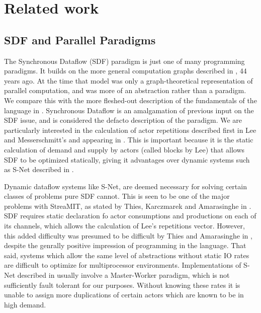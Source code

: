 \section{Related work}

\subsection*{SDF and Parallel Paradigms}

The Synchronous Dataflow (SDF) paradigm is just one of many programming paradigms.
It builds on the more general computation graphs described in \cite{kar66}, 44 years ago.
At the time that model was only a graph-theoretical representation of parallel computation, and was more of an abstraction rather than a paradigm.
We compare this with the more fleshed-out description of the fundamentals of the language in \cite{sdfBook}.
Synchronous Dataflow is an amalgamation of previous input on the SDF issue, and is considered the defacto description of the paradigm.
We are particularly interested in the calculation of actor repetitions described first in Lee and Messerschmitt's \cite{lee87} and appearing in \cite{sdfBook}.
This is important because it is the static calculation of demand and supply by actors (called blocks by Lee) that allows SDF to be optimized statically, giving it advantages over dynamic systems such as S-Net described in \cite{pen09}.

Dynamic dataflow systems like S-Net, are deemed necessary for solving certain classes of problems pure SDF cannot.
This is seen to be one of the major problems with StreaMIT, as stated by Thies, Karczmarek and Amarasinghe in \cite{thies02}.
SDF requires static declaration fo actor consumptions and productions on each of its channels, which allows the calculation of Lee's repetitions vector.
However, this added difficulty was presumed to be difficult by Thies and Amarasinghe in \cite{thies10}, despite the genrally positive impression of programming in the language.
That said, systems which allow the same level of abstractions without static IO rates are difficult to optimize for multiprocessor environments.
Implementations of S-Net described in \cite{pen09} usually involve a Master-Worker paradigm, which is not sufficiently fault tolerant for our purposes.
Without knowing these rates it is unable to assign more duplications of certain actors which are known to be in high demand.

